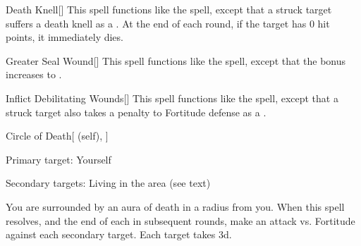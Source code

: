 \lowercase{\hypertarget{spell:Death Knell}{}}\label{spell:Death Knell}
\begin{freeability}[\nth{3}]{\hypertarget{spell:Death Knell}{Death Knell}}[]
This spell functions like the  spell, except that a struck target suffers a death knell as a .
At the end of each round, if the target has 0 hit points, it immediately dies.
\end{freeability}
\vspace{0.25em}



\lowercase{\hypertarget{spell:Greater Seal Wound}{}}\label{spell:Greater Seal Wound}
\begin{freeability}[\nth{3}]{\hypertarget{spell:Greater Seal Wound}{Greater Seal Wound}}[]
This spell functions like the  spell, except that the bonus increases to .
\end{freeability}
\vspace{0.25em}



\lowercase{\hypertarget{spell:Inflict Debilitating Wounds}{}}\label{spell:Inflict Debilitating Wounds}
\begin{freeability}[\nth{3}]{\hypertarget{spell:Inflict Debilitating Wounds}{Inflict Debilitating Wounds}}[]
This spell functions like the  spell, except that a struck target also takes a  penalty to Fortitude defense as a .
\end{freeability}
\vspace{0.25em}



\lowercase{\hypertarget{spell:Circle of Death}{}}\label{spell:Circle of Death}
\begin{attuneability}[\nth{4}]{\hypertarget{spell:Circle of Death}{Circle of Death}}[ (self), ]

Primary target: Yourself
\par\noindent
Secondary targets: Living  in the area (see text)

You are surrounded by an aura of death in a \areamed radius  from you.
When this spell resolves, and the end of each  in subsequent rounds, make an attack vs. Fortitude against each secondary target.
\hit Each target takes  \minus3d.
\end{attuneability}
\vspace{0.25em}



